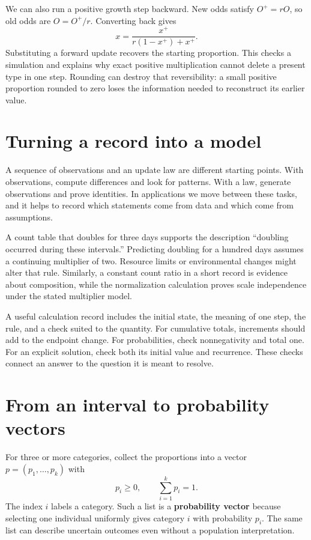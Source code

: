 \documentclass[11pt,oneside,openany]{book}
\theoremstyle{definition}
\theoremstyle{remark}
\numberwithin{equation}{chapter}
\begin{document}
We can also run a positive growth step backward. New odds satisfy \(O^+=rO\), so old odds are \(O=O^+/r\). Converting back gives \[x=\frac{x^+}{r(1-x^+)+x^+}.\] Substituting a forward update recovers the starting proportion. This checks a simulation and explains why exact positive multiplication cannot delete a present type in one step. Rounding can destroy that reversibility: a small positive proportion rounded to zero loses the information needed to reconstruct its earlier value.

\section{Turning a record into a model}\label{ch01-turning-a-record-into-a-model}

A sequence of observations and an update law are different starting points. With observations, compute differences and look for patterns. With a law, generate observations and prove identities. In applications we move between these tasks, and it helps to record which statements come from data and which come from assumptions.

A count table that doubles for three days supports the description ``doubling occurred during these intervals.'' Predicting doubling for a hundred days assumes a continuing multiplier of two. Resource limits or environmental changes might alter that rule. Similarly, a constant count ratio in a short record is evidence about composition, while the normalization calculation proves scale independence under the stated multiplier model.

A useful calculation record includes the initial state, the meaning of one step, the rule, and a check suited to the quantity. For cumulative totals, increments should add to the endpoint change. For probabilities, check nonnegativity and total one. For an explicit solution, check both its initial value and recurrence. These checks connect an answer to the question it is meant to resolve.

\section{From an interval to probability vectors}\label{ch01-from-an-interval-to-probability-vectors}

For three or more categories, collect the proportions into a vector \(p=(p_1,\ldots,p_k)\) with \[p_i\geq0,\qquad \sum_{i=1}^k p_i=1.\] The index \(i\) labels a category. Such a list is a \textbf{probability vector} because selecting one individual uniformly gives category \(i\) with probability \(p_i\). The same list can describe uncertain outcomes even without a population interpretation.
\end{document}
